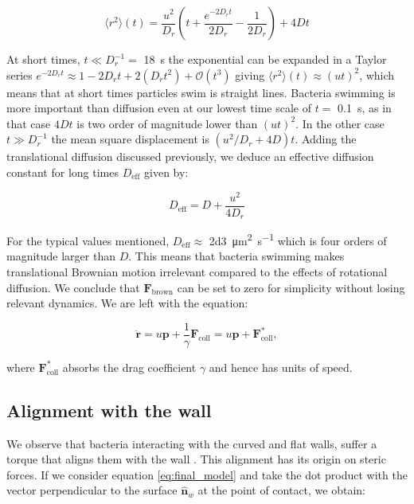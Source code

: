 \begin{equation} 
    \langle r^2 \rangle (t) = \frac{u^2}{D_r}\left( t + \frac{e^{-2D_rt}}{2D_r} - \frac{1}{2D_r} \right) + 4Dt
\end{equation}

At short times,  $t \ll D_r^{-1} =$ \SI{18}{\second} the exponential can be expanded in a Taylor series $e^{-2D_rt}\approx 1 - 2D_rt + 2(D_r t^2) + \mathcal{O}(t^3)$ giving $\langle r^2 \rangle (t)  \approx (ut)^2$, which means that at short times particles swim is straight lines. Bacteria swimming is more important than diffusion even at our lowest time scale of $t=$ \SI{0.1}{\second}, as in that case $4Dt$ is two order of magnitude lower than $(ut)^2$. In the other case $t \gg D_r^{-1}$ the mean square displacement is $(u^2/D_r+4D)t$. Adding the translational diffusion discussed previously, we deduce an effective diffusion constant for long times $D_{\text{eff}}$ given by:

\begin{equation}
    D_{\text{eff}} = D + \frac{u^2}{4D_r}
\end{equation}

For the typical values mentioned, $D_{\text{eff}}\approx$ \SI[per-mode = symbol]{2d3}{\square\micro\meter \per \second} which is four orders of magnitude larger than $D$. This means that bacteria swimming makes translational Brownian motion irrelevant compared to the effects of rotational diffusion. We conclude that $\textbf{F}_{\text{brown}}$ can be set to zero for simplicity without losing relevant dynamics. We are left with the equation:

\begin{equation} \label{eq:final_model}
    \dot{\textbf{r}} = u\textbf{p} + \frac{1}{\gamma}\textbf{F}_{\text{coll}} = u\textbf{p} + \textbf{F}^*_{\text{coll}} ,
\end{equation}

where $\textbf{F}^*_{\text{coll}}$ absorbs the drag coefficient $\gamma$ and hence has units of speed.

\subsection{Alignment with the wall}
\label{section:steric alignment}

We observe that bacteria interacting with the curved and flat walls, suffer a torque that aligns them with the wall \cite{Bianchi2017HolographicBacteria}. This alignment has its origin on steric forces. If we consider equation \eqref{eq:final_model} and take the dot product with the vector perpendicular to the surface  $\hat{\textbf{n}}_w$ at the point of contact, we obtain:

